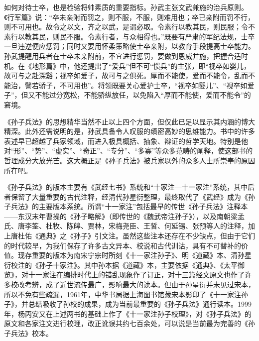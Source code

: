 \documentclass[12pt,UTF8]{ctexbook}
\begin{document}
如何对待士卒，也是检验将帅素质的重要指标。孙武主张文武兼施的治兵原则。《行军篇》说：“卒未亲附而罚之，则不服，不服，则难用也；卒已亲附而罚不行，则不可用也。故令之以文，齐之以武，是谓必取。令素行以教其民，则民服；令不素行以教其民，则民不服。令素行者，与众相得也。”既要有严肃的军纪法规，士卒一旦违逆便应惩罚；同时又要用怀柔策略使士卒亲附，以教育手段提高士卒能力。孙武提醒用兵者在士卒未亲附前，不宜进行惩罚，要做到恩威并施，把握合适时机。在《地形篇》中，他还提出了“爱兵”但不可“惯兵”的主张，即“视卒如婴儿，故可与之赴深谿；视卒如爱子，故可与之俱死。厚而不能使，爱而不能令，乱而不能治，譬若骄子，不可用也”。将领既要关心爱护士卒，“视卒如婴儿”、“视卒如爱子”，但又不能过分宽松，不能骄纵放任，以免陷入“厚而不能使，爱而不能令”的窘境。

《孙子兵法》的思想精华当然不止以上四个方面，但仅此已足以显示其内涵的博大精深。此外还需说明的是，孙武具备令人叹服的缜密高妙的思维能力。书中的许多表述早已超越了兵家领域，而进入极具概括、抽象、辩证的哲学天地。特别是他对“形”、“势”、“虚实”、“奇正”、“专分”、“多寡”等众多范畴的阐释，使这部书的哲理成分大放光芒。这大概正是《孙子兵法》被兵家以外的众多人士所崇奉的原因所在吧。

《孙子兵法》的版本主要有《武经七书》系统和“十家注—十一家注”系统，其中后者保留了大量重要的古代注释，经清代孙星衍整理，最终取代了《武经》成为《孙子兵法》的主要版本系统。所谓“十一家注”包括最早的传世《孙子兵法》注释本——东汉末年曹操的《孙子略解》（即传世的《魏武帝注孙子》），以及南朝梁孟氏、唐李筌、杜牧、陈皞、贾林，宋梅尧臣、王皙、何延锡、张预等人的注释，加上唐杜佑《通典》之《孙子》引文注。虽然这些注本还存在不少缺点，但由于它们的时代较早，为我们保存了许多古文异本、校说和古代训诂，具有不可替补的价值。现存重要的版本为南宋宁宗时所刻《十一家注孙子》、明《道藏》本、清孙星衍校注的《孙子十家注》。其中孙本据《道藏》本，主要依据《通典》、《太平御览》，对十一家注在编排时代上的错乱现象作了订正，对十三篇经文原文也作了许多校改考辨，成了近世流传最广，影响最大的读本。但由于孙星衍并未见过宋本，所以不免有些疏漏，1961年，中华书局据上海图书馆藏宋本影印了《十一家注孙子》，并总结吸收了孙校的成果，成为当前最重要的《孙子兵法》通行读本。1999年，杨丙安又在上述两书的基础上作了《十一家注孙子校理》，对《孙子兵法》的原文和各家注文进行校理，改正讹误共约七百余处，可以说是当前最为完善的《孙子兵法》校本。
\end{document}
